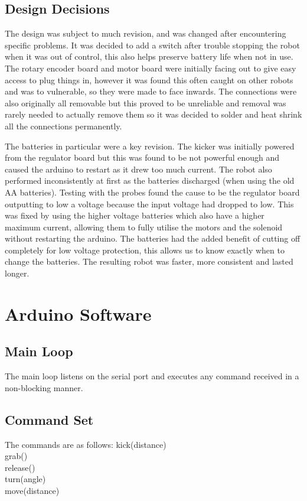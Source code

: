 \subsection{Design Decisions}
The design was subject to much revision, and was changed after encountering specific problems. It was decided to add a switch after trouble stopping the robot when it was out of control, this also helps preserve battery life when not in use. The rotary encoder board and motor board were initially facing out to give easy access to plug things in, however it was found this often caught on other robots and was to vulnerable, so they were made to face inwards. The connections were also originally all removable but this proved to be unreliable and removal was rarely needed to actually remove them so it was decided to solder and heat shrink all the connections permanently.

The batteries in particular were a key revision. The kicker was initially powered from the regulator board but this was found to be not powerful enough and caused the arduino to restart as it drew too much current. The robot also performed inconsistently at first as the batteries discharged (when using the old AA batteries). Testing with the probes found the cause to be the regulator board outputting to low a voltage because the input voltage had dropped to low. This was fixed by using the higher voltage batteries which also have a higher maximum current, allowing them to fully utilise the motors and the solenoid without restarting the arduino. The batteries had the added benefit of cutting off completely for low voltage protection, this allows us to know exactly when to change the batteries. The resulting robot was faster, more consistent and lasted longer. 

\section{Arduino Software}
\subsection{Main Loop}
The main loop listens on the serial port and executes any command received in a non-blocking manner. 
\subsection{Command Set}
The commands are as follows:
kick(distance)\\
grab()\\
release()\\
turn(angle)\\
move(distance)\\
